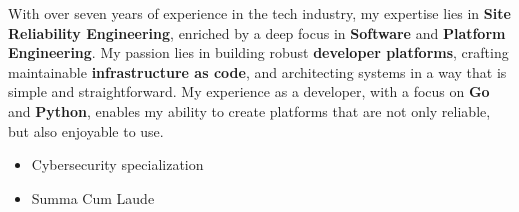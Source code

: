 \documentclass[10pt,a4paper,ragged2e,withhyper,hidelinks]{altacv}
\begin{document}

\begin{fullwidth}
  \makecvheader
\end{fullwidth}



\begin{paracol}{2}



  \small{With over seven years of experience in the tech industry, my expertise lies in \textbf{Site Reliability Engineering}, enriched by a deep focus in \textbf{Software} and \textbf{Platform Engineering}. My passion lies in building robust \textbf{developer platforms}, crafting maintainable \textbf{infrastructure as code}, and architecting systems in a way that is simple and straightforward. My experience as a developer, with a focus on \textbf{Go} and \textbf{Python}, enables my ability to create platforms that are not only reliable, but also enjoyable to use.}


  \switchcolumn




  \begin{itemize}
    \setlength{\itemindent}{0em}
    \item   \small{Cybersecurity specialization}
    \item   \small{Summa Cum Laude}
  \end{itemize}

\end{paracol}

\medskip
\smallskip
\end{document}

